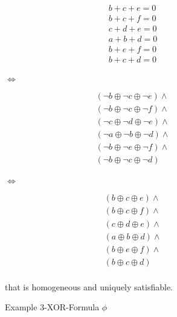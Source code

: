 \begin{figure}[htbp!]
	\centering
	\begin{minipage}{.2\textwidth}
		\begin{align*}
			b + c + e = 0 \\
			b + c + f = 0 \\
			c + d + e = 0 \\
			a + b + d = 0 \\
			b + e + f = 0 \\
			b + c + d = 0 \\
		\end{align*}  
	\end{minipage}
	$\iff$
	\begin{minipage}{.2\textwidth}
		\begin{align*}
			(\lnot b \oplus \lnot c \oplus \lnot e) \land \\
			(\lnot b \oplus \lnot c \oplus \lnot f) \land \\
			(\lnot c \oplus \lnot d \oplus \lnot e) \land \\
			(\lnot a \oplus \lnot b \oplus \lnot d) \land \\
			(\lnot b \oplus \lnot e \oplus \lnot f) \land \\
			(\lnot b \oplus \lnot c \oplus \lnot d) \\
		\end{align*}    
	\end{minipage}
	$\iff$
	\begin{minipage}{.2\textwidth}
		\begin{align*}
			(b \oplus c \oplus e) \land \\
			(b \oplus c \oplus f) \land \\
			(c \oplus d \oplus e) \land \\
			(a \oplus b \oplus d) \land \\
			(b \oplus e \oplus f) \land \\
			(b \oplus c \oplus d) \\
		\end{align*}    
	\end{minipage}
	
	\caption{Example 3-XOR-Formula $\phi$}{that is homogeneous and uniquely satisfiable.}
	\label{fig:3xor}
\end{figure}
